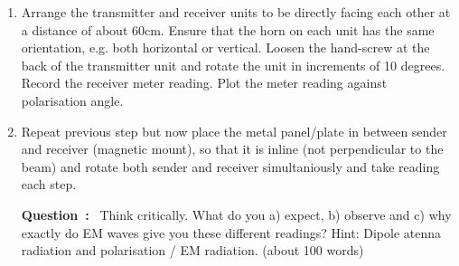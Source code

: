 \documentclass{article}
\newcounter{question}
\newcommand{\Question}{\textbf{Question~\thequestion:}~ \stepcounter{question}}
\begin{document}
\begin{enumerate}
\section*{Polarisation}

In this part of the experiment, the polarisation properties of the microwave beam will be investigated. The microwave beam is linearly polarised along the transmitter diode axis, see Figure \ref{fig:polarization}. Similarly, the receiver diode only detects the component of the incident microwave field that is parallel to its axis.
\begin{figure}[!h]
\begin{centering}

\caption{\label{fig:polarization}Detecting polarized radiation.}
\end{centering}
\end{figure}
  

\item Arrange the transmitter and receiver units to be directly facing each other at a distance of about 60cm. Ensure that the horn on each unit has the same orientation, e.g. both horizontal or vertical.  Loosen the hand-screw at the back of the transmitter unit and rotate the unit in increments of 10 degrees. Record the receiver meter reading. Plot the meter reading against polarisation angle.

\item Repeat previous step but now place the metal panel/plate in between sender and receiver (magnetic mount), so that it is inline (not perpendicular to the beam) and rotate both sender and receiver simultaniously and take reading each step. 

\Question Think critically. What do you a) expect, b) observe and c) why exactly do EM waves give you these different readings? Hint: Dipole atenna radiation and polarisation / EM radiation.  (about 100 words)




\end{enumerate}
\end{document}

